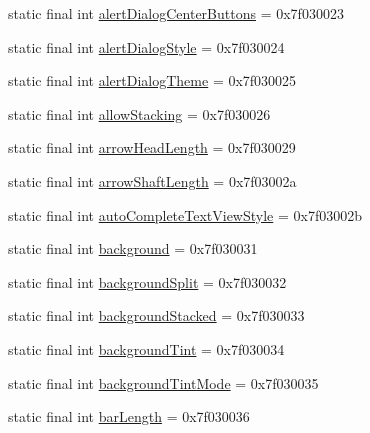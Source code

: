 \begin{DoxyCompactItemize}
\item 
static final int \mbox{\hyperlink{classcom_1_1google_1_1android_1_1gms_1_1R_1_1attr_a5bf97b45de9824ac648fe587a8502474}{alert\+Dialog\+Center\+Buttons}} = 0x7f030023
\item 
static final int \mbox{\hyperlink{classcom_1_1google_1_1android_1_1gms_1_1R_1_1attr_ad3c44574d9e8bd1d10aa90e5ef4dd9bc}{alert\+Dialog\+Style}} = 0x7f030024
\item 
static final int \mbox{\hyperlink{classcom_1_1google_1_1android_1_1gms_1_1R_1_1attr_ad2ff364fee6010b70c7f99f815c380bb}{alert\+Dialog\+Theme}} = 0x7f030025
\item 
static final int \mbox{\hyperlink{classcom_1_1google_1_1android_1_1gms_1_1R_1_1attr_a9c4ffce53fea344286c03fccdf69b068}{allow\+Stacking}} = 0x7f030026
\item 
static final int \mbox{\hyperlink{classcom_1_1google_1_1android_1_1gms_1_1R_1_1attr_ab5f49c4ea42f69799a01b3b4665cd0d5}{arrow\+Head\+Length}} = 0x7f030029
\item 
static final int \mbox{\hyperlink{classcom_1_1google_1_1android_1_1gms_1_1R_1_1attr_a5f9aceeee11b3144f4ed5f1c4ecfce8b}{arrow\+Shaft\+Length}} = 0x7f03002a
\item 
static final int \mbox{\hyperlink{classcom_1_1google_1_1android_1_1gms_1_1R_1_1attr_a239271a063db38fb58cc9f95bc2b682a}{auto\+Complete\+Text\+View\+Style}} = 0x7f03002b
\item 
static final int \mbox{\hyperlink{classcom_1_1google_1_1android_1_1gms_1_1R_1_1attr_a0842b0ec26d08184ab653afde6725a93}{background}} = 0x7f030031
\item 
static final int \mbox{\hyperlink{classcom_1_1google_1_1android_1_1gms_1_1R_1_1attr_a20a7becd7b619084fae8448192a41ac9}{background\+Split}} = 0x7f030032
\item 
static final int \mbox{\hyperlink{classcom_1_1google_1_1android_1_1gms_1_1R_1_1attr_a5e695b28bb5f75733783cd064d753a1f}{background\+Stacked}} = 0x7f030033
\item 
static final int \mbox{\hyperlink{classcom_1_1google_1_1android_1_1gms_1_1R_1_1attr_ad1821afcd6cbd567dead8e2279d5ded1}{background\+Tint}} = 0x7f030034
\item 
static final int \mbox{\hyperlink{classcom_1_1google_1_1android_1_1gms_1_1R_1_1attr_a182fbc13c4365f0dbb60811d83b91336}{background\+Tint\+Mode}} = 0x7f030035
\item 
static final int \mbox{\hyperlink{classcom_1_1google_1_1android_1_1gms_1_1R_1_1attr_af7e729f25b65e4345b077b9182bd34e7}{bar\+Length}} = 0x7f030036

\end{DoxyCompactItemize}
